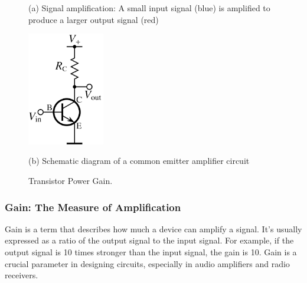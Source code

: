 \begin{figure}[h!]
    \centering
    \begin{minipage}{0.45\textwidth}
        \caption*{(a) Signal amplification: A small input signal (blue) is amplified to produce a larger output signal (red)}
    \end{minipage}%
    \hfill%
    \begin{minipage}{0.4\textwidth}
        \includegraphics[width=0.3\textwidth]{images/transistor-amplifier.png}
        \caption*{(b) Schematic diagram of a common emitter amplifier circuit}
    \end{minipage}
    \caption{Transistor Power Gain. }
    \label{fig:transistor_power_gain}
\end{figure}

\subsubsection*{Gain: The Measure of Amplification}
Gain is a term that describes how much a device can amplify a signal. It’s usually expressed as a ratio of the output signal to the input signal. For example, if the output signal is 10 times stronger than the input signal, the gain is 10. Gain is a crucial parameter in designing circuits, especially in audio amplifiers and radio receivers.

